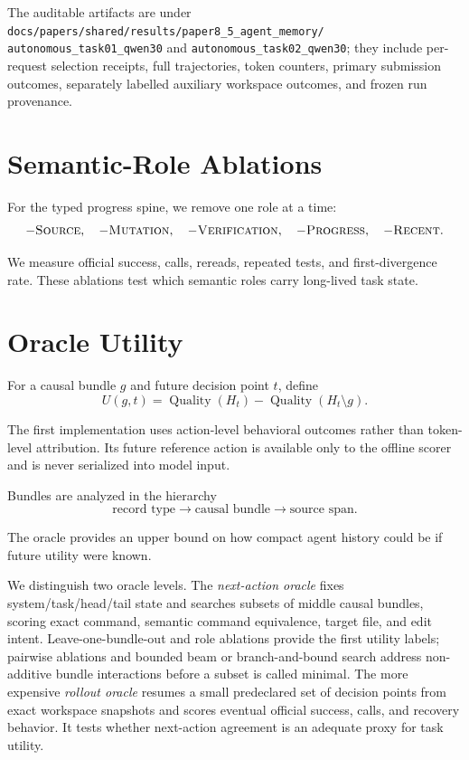 \documentclass[11pt]{article}
\begin{document}
The auditable artifacts are under
\texttt{docs/papers/shared/results/paper8\_5\_agent\_memory/}
\texttt{autonomous\_task01\_qwen30} and
\texttt{autonomous\_task02\_qwen30}; they include per-request selection
receipts, full trajectories, token counters, primary submission outcomes,
separately labelled auxiliary workspace outcomes, and frozen run provenance.

\section{Semantic-Role Ablations}

For the typed progress spine, we remove one role at a time:
\[
-\textsc{Source},\quad
-\textsc{Mutation},\quad
-\textsc{Verification},\quad
-\textsc{Progress},\quad
-\textsc{Recent}.
\]

We measure official success, calls, rereads, repeated tests, and first-divergence
rate. These ablations test which semantic roles carry long-lived task state.

\section{Oracle Utility}

For a causal bundle $g$ and future decision point $t$, define
\[
U(g,t)=
\operatorname{Quality}(H_t)
-
\operatorname{Quality}(H_t\setminus g).
\]

The first implementation uses action-level behavioral outcomes rather than
token-level attribution. Its future reference action is available only to the
offline scorer and is never serialized into model input.

Bundles are analyzed in the hierarchy
\[
\text{record type}
\rightarrow
\text{causal bundle}
\rightarrow
\text{source span}.
\]

The oracle provides an upper bound on how compact agent history could be if
future utility were known.

We distinguish two oracle levels. The \emph{next-action oracle} fixes
system/task/head/tail state and searches subsets of middle causal bundles,
scoring exact command, semantic command equivalence, target file, and edit
intent. Leave-one-bundle-out and role ablations provide the first utility
labels; pairwise ablations and bounded beam or branch-and-bound search address
non-additive bundle interactions before a subset is called minimal. The more
expensive \emph{rollout oracle} resumes a small predeclared set of decision
points from exact workspace snapshots and scores eventual official success,
calls, and recovery behavior. It tests whether next-action agreement is an
adequate proxy for task utility.
\end{document}
